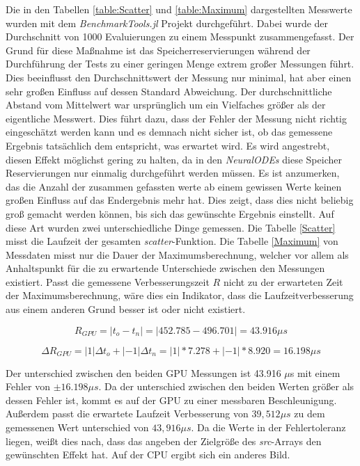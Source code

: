 Die in den Tabellen \ref{table:Scatter} und \ref{table:Maximum} dargestellten Messwerte wurden mit dem \textit{BenchmarkTools.jl} Projekt durchgeführt.
Dabei wurde der Durchschnitt von 1000 Evaluierungen zu einem Messpunkt zusammengefasst.
Der Grund für diese Maßnahme ist das Speicherreservierungen während der Durchführung der Tests zu einer geringen Menge extrem großer 
Messungen führt.
Dies beeinflusst den Durchschnittswert der Messung nur minimal, hat aber einen sehr großen Einfluss auf dessen Standard Abweichung.
Der durchschnittliche Abstand vom Mittelwert war ursprünglich
um ein Vielfaches größer als der eigentliche Messwert.
Dies führt dazu, dass der Fehler der Messung nicht richtig eingeschätzt werden kann und es demnach nicht sicher ist, ob das gemessene Ergebnis tatsächlich dem entspricht, was erwartet wird.
Es wird angestrebt, diesen Effekt möglichst gering zu halten, da in den \textit{NeuralODEs} diese Speicher Reservierungen nur einmalig durchgeführt werden müssen.
Es ist anzumerken, das die Anzahl der zusammen gefassten werte ab einem gewissen Werte keinen großen Einfluss auf das Endergebnis mehr hat.
Dies zeigt, dass dies nicht beliebig groß gemacht werden können, bis sich das gewünschte Ergebnis einstellt.
Auf diese Art wurden zwei unterschiedliche Dinge gemessen.
Die Tabelle \ref{Scatter} misst die Laufzeit der gesamten \textit{scatter}-Funktion.
Die Tabelle \ref{Maximum} von Messdaten misst nur die Dauer der Maximumsberechnung, welcher vor allem als Anhaltspunkt für die zu erwartende Unterschiede zwischen den Messungen 
existiert.
Passt die gemessene Verbesserungszeit $R$ nicht zu der erwarteten Zeit der Maximumsberechnung, wäre dies ein Indikator, dass die Laufzeitverbesserung aus einem anderen Grund besser ist oder nicht existiert.

$$
 R_{GPU} = | t_o - t_n | = | 452.785 - 496.701 | = 43.916 \mu s
$$

$$
 \Delta R_{GPU} = | 1 | \Delta t_o + |-1| \Delta t_n = | 1| * 7.278 +  |-1| * 8.920 = 16.198 \mu s
$$

Der unterschied zwischen den beiden GPU Messungen ist 43.916 $\mu$s mit einem Fehler von $\pm 16.198 \mu s$.
Da der unterschied zwischen den beiden Werten größer als dessen Fehler ist, kommt es auf der GPU zu einer messbaren Beschleunigung.
Außerdem passt die erwartete Laufzeit Verbesserung von $39,512 \mu s$ zu dem gemessenen Wert unterschied von $43,916 \mu s$.
Da die Werte in der Fehlertoleranz liegen, weißt dies nach, dass das angeben der Zielgröße des \textit{src}-Arrays den gewünschten Effekt hat.
Auf der CPU ergibt sich ein anderes Bild.

